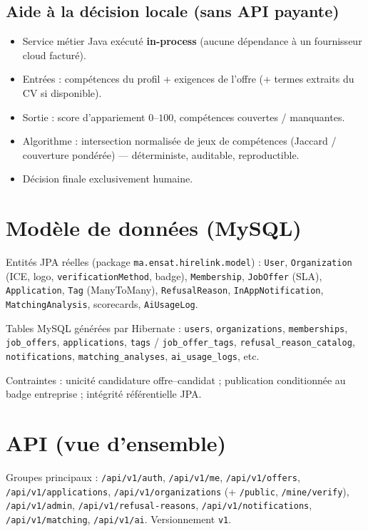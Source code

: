 \documentclass[12pt,a4paper,oneside]{report}
\begin{document}
\section{Aide à la décision locale (sans API payante)}
\begin{itemize}[leftmargin=1.4em]
  \item Service métier Java exécuté \textbf{in-process} (aucune dépendance à un fournisseur cloud facturé).
  \item Entrées : compétences du profil + exigences de l'offre (+ termes extraits du CV si disponible).
  \item Sortie : score d'appariement $0$--$100$, compétences couvertes / manquantes.
  \item Algorithme : intersection normalisée de jeux de compétences (Jaccard / couverture pondérée) --- déterministe, auditable, reproductible.
  \item Décision finale exclusivement humaine.
\end{itemize}

\chapter{Modèle de données (MySQL)}
\label{ch:data}

Entités JPA réelles (package \texttt{ma.ensat.hirelink.model}) : \texttt{User}, \texttt{Organization} (ICE, logo, \texttt{verificationMethod}, badge), \texttt{Membership}, \texttt{JobOffer} (SLA), \texttt{Application}, \texttt{Tag} (ManyToMany), \texttt{RefusalReason}, \texttt{InAppNotification}, \texttt{MatchingAnalysis}, scorecards, \texttt{AiUsageLog}.

Tables MySQL générées par Hibernate : \texttt{users}, \texttt{organizations}, \texttt{memberships}, \texttt{job\_offers}, \texttt{applications}, \texttt{tags} / \texttt{job\_offer\_tags}, \texttt{refusal\_reason\_catalog}, \texttt{notifications}, \texttt{matching\_analyses}, \texttt{ai\_usage\_logs}, etc.

Contraintes : unicité candidature offre--candidat ; publication conditionnée au badge entreprise ; intégrité référentielle JPA.

\chapter{API (vue d'ensemble)}
\label{ch:api}

Groupes principaux : \texttt{/api/v1/auth}, \texttt{/api/v1/me}, \texttt{/api/v1/offers}, \texttt{/api/v1/applications}, \texttt{/api/v1/organizations} (+ \texttt{/public}, \texttt{/mine/verify}), \texttt{/api/v1/admin}, \texttt{/api/v1/refusal-reasons}, \texttt{/api/v1/notifications}, \texttt{/api/v1/matching}, \texttt{/api/v1/ai}. Versionnement \texttt{v1}.
\end{document}
